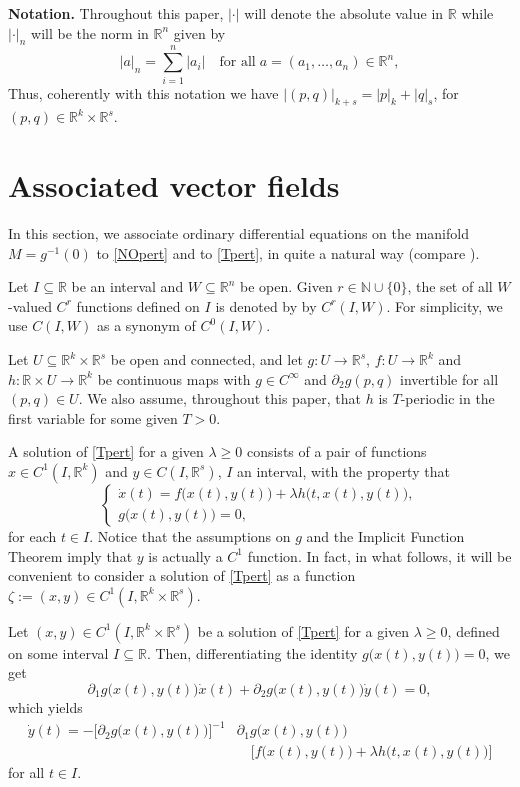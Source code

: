 \documentclass[a4paper]{amsart}
\numberwithin{equation}{section}
\newcommand{\R}{\mathbb{R}}
\newcommand{\N}{\mathbb{N}}
\begin{document}
\smallskip
\noindent\textbf{Notation.} Throughout this paper, $|\cdot|$ will denote the absolute value 
in $\R$ while $|\cdot|_n$ will be the norm in $\R^n$ given by
\[
|a|_n=\sum_{i=1}^n|a_i|\quad\text{for all}\; a=(a_1,\ldots,a_n)\in\R^n,
\]
Thus, coherently with this notation we have $\big|(p,q)\big|_{k+s}=|p|_k+|q|_s$, for 
$(p,q)\in\R^k\times\R^s$.


\section{Associated vector fields}\label{assocVF}
In this section, we associate ordinary differential equations on the manifold $M=g^{-1}(0)$ 
to \eqref{NOpert} and to \eqref{Tpert}, in quite a natural way (compare \cite[\S 4.5]{KM}). 

Let $I\subseteq\R$ be an interval and $W\subseteq\R^n$ be open. Given $r\in\N\cup\{0\}$,
the set of all $W$-valued $C^r$ functions defined on $I$ is denoted by by $C^r(I,W)$. For
simplicity, we use $C(I,W)$ as a synonym of $C^0(I,W)$.

Let $U\subseteq\R^k\times\R^s$ be open and connected, and let $g:U\to\R^s$, $f:U\to\R^k$ and 
$h:\R\times U\to\R^k$ be continuous maps with $g\in C^\infty$ and $\partial_2g(p,q)$ invertible 
for all $(p,q)\in U$. We also assume, throughout this paper, that $h$ is $T$-periodic in the 
first variable for some given $T>0$. 

A solution of \eqref{Tpert} for a given $\lambda\geq 0$ consists of a pair of functions 
$x\in C^1(I,\R^k)$ and $y\in C(I,\R^s)$, $I$  an interval, with the property that 
\[
\left\{
\begin{array}{l}
 \dot x(t)=f\big(x(t),y(t)\big)+\lambda h\big(t,x(t),y(t)\big),\\
 g\big(x(t),y(t)\big)=0,
\end{array}
\right.
\]
for each $t\in I$.
Notice that the assumptions on $g$ and the Implicit Function Theorem imply that $y$ is 
actually a $C^1$ function. In fact, in what follows, it will be convenient to consider 
a solution of \eqref{Tpert} as a function $\zeta:=(x,y)\in C^1(I,\R^k\times\R^s)$. 

Let $(x,y)\in C^1(I,\R^k\times\R^s)$ be a solution of \eqref{Tpert} for a given $\lambda\geq 0$, 
defined on some interval $I\subseteq\R$. Then, differentiating the identity $g\big(x(t),y(t)\big)=0$, 
we get
\[
 \partial_1g\big(x(t),y(t)\big)\dot x(t)+\partial_2g\big(x(t),y(t)\big)\dot y(t)=0,
\]
which yields 
\begin{equation}\label{soly}
\begin{split}
\dot y(t)=-\big[\partial_2g\big(x(t),y(t))\big]^{-1}&\partial_1g\big(x(t),y(t)\big)\\
&\quad\Big[f\big(x(t),y(t)\big)+\lambda h\big(t,x(t),y(t)\big)\Big]
\end{split}
\end{equation}
for all $t\in I$.
\end{document}
